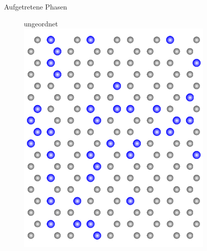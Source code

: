 \documentclass{beamer}
\begin{document}
\begin{frame}{Aufgetretene Phasen}
\begin{figure}
\begin{minipage}[b]{0.32\textwidth}
			\end{minipage}
			\hfill
			\begin{minipage}[b]{0.32\textwidth}
				\centering
				ungeordnet
				\includegraphics[width=0.85\textwidth, angle=90]{Abbildungen/random.pdf}
			\end{minipage}
			
			\medskip
			

\end{figure}
\end{frame}
\end{document}
